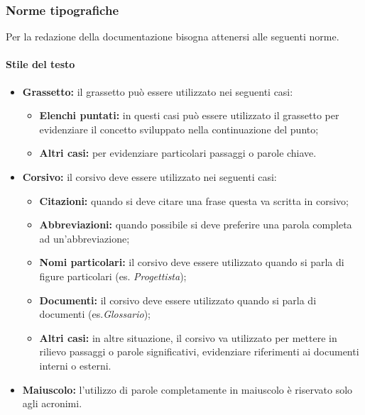 \subsubsection{Norme tipografiche}
Per la redazione della documentazione bisogna attenersi alle seguenti norme.

\paragraph{Stile del testo}
\begin{itemize}
	\item \textbf{Grassetto:} il grassetto può essere utilizzato nei seguenti casi:
	      \begin{itemize}
		      \item \textbf{Elenchi puntati:} in questi casi può essere utilizzato il grassetto per evidenziare il concetto sviluppato nella continuazione del punto;
		      \item \textbf{Altri casi:} per evidenziare particolari passaggi o parole chiave.
	      \end{itemize}

	\item \textbf{Corsivo:} il corsivo deve essere utilizzato nei seguenti casi:
	      \begin{itemize}
		      \item \textbf{Citazioni:} quando si deve citare una frase questa va scritta in corsivo;
		      \item \textbf{Abbreviazioni:} quando possibile si deve preferire una parola completa ad un’abbreviazione;
		      \item \textbf{Nomi particolari:} il corsivo deve essere utilizzato quando si parla di figure particolari (es. \textit{Progettista});
		      \item \textbf{Documenti:} il corsivo deve essere utilizzato quando si parla di documenti (es.\textit{Glossario});
		      \item \textbf{Altri casi:} in altre situazione, il corsivo va utilizzato per mettere in rilievo passaggi o parole significativi, evidenziare riferimenti ai documenti interni o esterni.
	      \end{itemize}

	\item \textbf{Maiuscolo:} l’utilizzo di parole completamente in maiuscolo è riservato solo agli acronimi.

\end{itemize}

